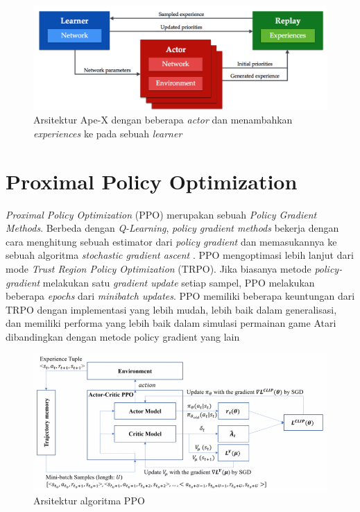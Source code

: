 \begin{figure}[H]
  \centering
    \includegraphics[scale=0.5]{gambar/apex1.png}
    \caption{Arsitektur Ape-X dengan beberapa \emph{actor} dan menambahkan \emph{experiences} ke pada sebuah \emph{learner}}
    \label{fig:apexDQNArchitecture}
\end{figure}

\section{Proximal Policy Optimization}

\emph{Proximal Policy Optimization} (PPO) merupakan sebuah \emph{Policy Gradient Methods}. 
Berbeda dengan \emph{Q-Learning}, \emph{policy gradient methods} bekerja dengan cara menghitung sebuah estimator dari \emph{policy gradient} dan memasukannya ke
sebuah algoritma \emph{stochastic gradient ascent} \citep{ppo}. PPO mengoptimasi lebih lanjut dari mode \emph{Trust Region Policy Optimization} (TRPO).
Jika biasanya metode \emph{policy-gradient} melakukan satu \emph{gradient update} setiap sampel, PPO melakukan beberapa \emph{epochs} dari \emph{minibatch updates}. 
PPO memiliki beberapa keuntungan dari TRPO dengan implementasi yang lebih mudah, lebih baik dalam generalisasi, dan memiliki performa yang lebih baik dalam simulasi permainan game Atari dibandingkan dengan metode policy gradient yang lain

\begin{figure}[H]
  \centering
    \includegraphics[scale=0.5]{gambar/ppo_model.png}
    \caption{Arsitektur algoritma PPO}
    \label{fig:ppoArchitecture}
\end{figure}

